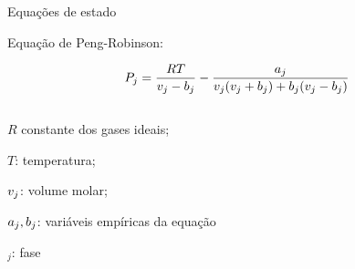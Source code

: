 \documentclass[professionalfont]{beamer}
\begin{document}
\begin{frame}{Equações de estado}



    
    Equação de Peng-Robinson:

    \begin{equation}
        \label{eq:eos.1}
        P_{j} = \dfrac{R T}{v_{j} - b_{j}} - \dfrac{a_{j}}{v_{j}(v_{j} + b_{j}) + b_{j}(v_{j} - b_{j})}
    \end{equation}
    \begin{columns}
        \begin{column}{0.6\textwidth}
            \begin{description}[]
                \item $R$ constante dos gases ideais;
                \item $T$: temperatura;
                \item $v_{j}$: volume molar;
                \item $a_{j}, b_{j}$: variáveis empíricas da equação
                \item $_{j}$: fase
            \end{description}
        \end{column}
    \end{columns}
    
\end{frame}



\end{document}
